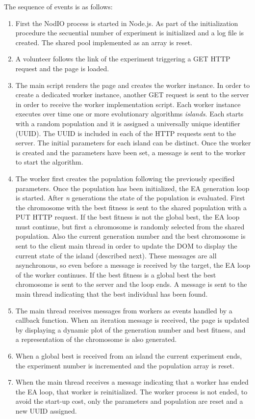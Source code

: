 \documentclass[journal,onecolumn]{IEEEtran}
\begin{document}
The sequence of events is as follows:
\begin{enumerate}
\item First the {\sf NodIO} process is started in Node.js. As part of the
initialization procedure the secuential number of experiment is initialized and a log
file is created. The shared pool implemented as an array is reset.
\item A volunteer follows the link of the experiment triggering a GET HTTP
request and the page is loaded.
\item The main script renders the page and creates the worker instance. In
order to create a dedicated worker instance, another GET request is sent to the
server in order to receive the worker implementation script.
Each worker instance executes over time one or more evolutionary algorithms
{\em islands}. Each starts with a random population and it is assigned a
universally unique  identifier (UUID). The UUID is included in each of the HTTP
requests sent to the server.
The initial parameters for each island
can be distinct. Once the worker is created and the parameters have been set,
a message is sent to the worker to start the algorithm.
\item The worker first creates the population following the previously
specified parameters. Once the population has been initialized, the EA
generation loop is started. After {\em n} generations the state of the population
is evaluated. First the chromosome with the best fitness is sent to the shared
population with a PUT HTTP request. If the best fitness is not the global best,
the EA loop must continue, but first a chromosome is randomly selected from
the shared population. Also the current generation number and the best
chromosome is sent to the client main thread in order to update the DOM to
display the current state of the island (described next). These messages are
all asynchronous, so even before a message is received by the target, the EA loop of
the worker continues. If the best fitness is a global best the best
chromosome is sent to the server and the loop ends. A message is sent to the
main thread indicating that the best individual has been found.
\item The main thread receives messages from workers as events handled by
a callback function. When an iteration message is received, the page is
updated by displaying a dynamic plot of the generation number and best
fitness, and a representation of the chromosome is also generated.
\item When a global best is received from an island the current experiment
ends, the experiment number is incremented and the population array is reset.
\item When the main thread receives a message indicating that a worker has ended the EA
loop, that worker is reinitialized. The worker process is not ended, to
avoid the start-up cost, only the parameters and population are reset and a new UUID
assigned.
\end{enumerate}
\end{document}
